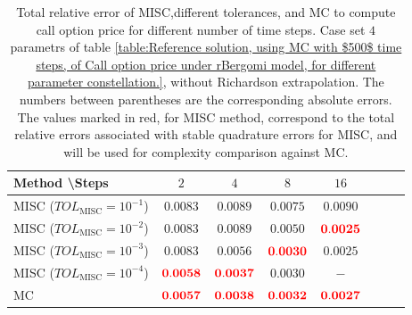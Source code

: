 \FloatBarrier

\begin{table}[h!]
	\centering
	\begin{tabular}{l*{6}{c}r}
		Method \textbackslash  Steps            & $2$ & $4$ & $8$ & $16$  \\
		\hline
		MISC ($TOL_{\text{MISC}}=10^{-1}$)  &  $\mathbf{0.0083}$ & $\mathbf{0.0089}$& $\mathbf{ 0.0075}$ & $\mathbf{ 0.0090}$   \\
		MISC ($TOL_{\text{MISC}}=10^{-2}$)  &  $\mathbf{0.0083}$ & $\mathbf{0.0089}$& $\mathbf{ 0.0050}$ & $\mathbf{ {\color{red}0.0025}}$  \\
		MISC ($TOL_{\text{MISC}}=10^{-3}$)  &  $\mathbf{0.0083}$& $\mathbf{0.0056}$& $\mathbf{{\color{red}0.0030}}$  & $\mathbf{ 0.0025}$  \\
		MISC ($TOL_{\text{MISC}}=10^{-4}$)  &  $\mathbf{{\color{red}0.0058}}$ & $\mathbf{{\color{red}0.0037}}$& $\mathbf{0.0030}$ & $\mathbf{ -}$ \\
		
		\hline
		MC    & $\mathbf{{\color{red}0.0057}}$  & $\mathbf{ {\color{red}0.0038}}$  & $\mathbf{{\color{red}0.0032}}$ & $\mathbf{ {\color{red}0.0027}}$  \\		
		\hline
	\end{tabular}
	\caption{Total relative error of MISC,different tolerances, and MC to compute call option price  for different number of time steps. Case set $4$ parametrs of table \ref{table:Reference solution, using MC with $500$ time steps, of Call option price under rBergomi model, for different parameter constellation.}, without Richardson extrapolation. The numbers between parentheses are the corresponding absolute errors. The values marked in red, for MISC method, correspond to the total relative errors associated with  stable quadrature errors for MISC, and will be used for complexity comparison against MC.}
	\label{Total error of MISC and MC to compute Call option price of the different tolerances for different number of time steps. Case set 4, without Richardson extrapolation. The numbers between parentheses are the corresponding absolute errors.}
\end{table}

